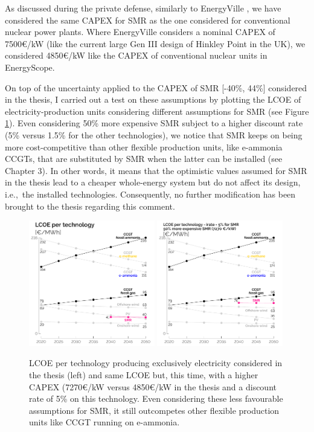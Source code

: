 \documentclass[12pt,a4paper]{article}
\def\ie{i.e.,\ }
\begin{document}
\noindent As discussed during the private defense, similarly to EnergyVille \cite{PATHS2050}, we have considered the same CAPEX for SMR as the one considered for conventional nuclear power plants. Where EnergyVille considers a nominal CAPEX of 7500€/kW (like the current large Gen III design of Hinkley Point in the UK), we considered 4850€/kW like the CAPEX of conventional nuclear units in EnergyScope. 

On top of the uncertainty applied to the CAPEX of SMR [-40\%, 44\%] considered in the thesis, I carried out a test on these assumptions by plotting the LCOE of electricity-production units considering different assumptions for SMR (see Figure \ref{fig:LCOE_comparison}). Even considering 50\% more expensive SMR subject to a higher discount rate (5\% versus 1.5\% for the other technologies), we notice that SMR keeps on being more cost-competitive than other flexible production units, like e-ammonia CCGTs, that are substituted by SMR when the latter can be installed (see Chapter 3). In other words, it means that the optimistic values assumed for SMR in the thesis lead to a cheaper whole-energy system but do not affect its design, \ie the installed technologies.  Consequently, no further modification has been brought to the thesis regarding this comment.

\begin{figure}[htbp!]
\centering
\includegraphics[width=0.49\textwidth]{LCOE_line_2.pdf}
\includegraphics[width=0.49\textwidth]{LCOE_line_3.pdf}
\label{fig:LCOE_comparison}
\caption{LCOE per technology producing exclusively electricity considered in the thesis (left) and same LCOE but, this time, with a higher CAPEX (7270€/kW versus 4850€/kW in the thesis and a discount rate of 5\% on this technology. Even considering these less favourable assumptions for SMR, it still outcompetes other flexible production units like CCGT running on e-ammonia.}
\end{figure}
\end{document}
